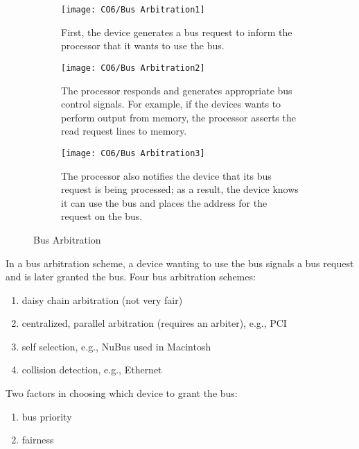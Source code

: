 \begin{figure}[!htb]
    \centering
    \begin{subfigure}{0.42\textwidth}
        \centering
        \texttt{[image: CO6/Bus Arbitration1]}
        \caption{\footnotesize First, the device generates a bus request to inform the processor that it wants to use the bus.}
    \end{subfigure}
    \begin{subfigure}{0.42\textwidth}
        \centering
        \texttt{[image: CO6/Bus Arbitration2]}
        \caption{\footnotesize The processor responds and generates appropriate bus control signals. For example, if the devices wants to perform output from memory, the processor asserts the read request lines to memory.}
    \end{subfigure}
    \begin{subfigure}{0.42\textwidth}
        \centering
        \texttt{[image: CO6/Bus Arbitration3]}
        \caption{\footnotesize The processor also notifies the device that its bus request is being processed; as a result, the device knows it can use the bus and places the address for the request on the bus.}
    \end{subfigure}
    \caption{Bus Arbitration}
\end{figure}

In a bus arbitration scheme, a device wanting to use the bus signals a bus request and is later granted the bus. Four bus arbitration schemes:
\begin{enumerate}\small
    \item daisy chain arbitration (not very fair)
    \item centralized, parallel arbitration (requires an arbiter), e.g., PCI
    \item self selection, e.g., NuBus used in Macintosh
    \item collision detection, e.g., Ethernet
\end{enumerate}
Two factors in choosing which device to grant the bus:
\begin{enumerate}\small
    \item bus priority
    \item fairness
\end{enumerate}


